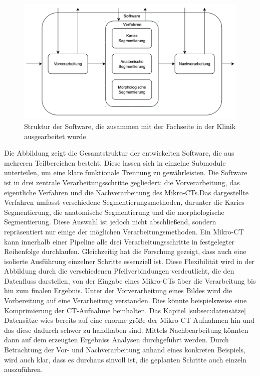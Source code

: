 \begin{figure}[h]
	\centering
	\includegraphics[width=1\textwidth]{img/struktur_der_software.png}
	\caption{Struktur der Software, die zusammen mit der Fachseite in der Klinik ausgearbeitet
	wurde}
	\label{fig:struktur_der_software}
\end{figure}

Die Abbildung zeigt die Gesamtstruktur der entwickelten Software, die aus mehreren
Teilbereichen besteht. Diese lassen sich in einzelne Submodule unterteilen, um eine
klare funktionale Trennung zu gewährleisten. Die Software ist in drei zentrale
Verarbeitungsschritte gegliedert: die Vorverarbeitung, das eigentliche Verfahren
und die Nachverarbeitung des Mikro-CTs.Das dargestellte Verfahren umfasst
verschiedene Segmentierungsmethoden, darunter die Karies-Segmentierung, die
anatomische Segmentierung und die morphologische Segmentierung. Diese Auswahl ist
jedoch nicht abschließend, sondern repräsentiert nur einige der möglichen
Verarbeitungsmethoden. Ein Mikro-CT kann innerhalb einer Pipeline alle drei Verarbeitungsschritte
in festgelegter Reihenfolge durchlaufen. Gleichzeitig hat die Forschung gezeigt,
dass auch eine isolierte Ausführung einzelner Schritte essenziell ist. Diese
Flexibilität wird in der Abbildung durch die verschiedenen Pfeilverbindungen
verdeutlicht, die den Datenfluss darstellen, von der Eingabe eines Mikro-CTs
über die Verarbeitung bis hin zum finalen Ergebnis. Unter der Vorverarbeitung eines
Bildes wird die Vorbereitung auf eine Verarbeitung verstanden. Dies könnte
beispielsweise eine Komprimierung der CT-Aufnahme beinhalten. Das Kapitel \ref{subsec:datensätze}
Datensätze wies bereits auf eine enorme größe der Mikro-CT-Aufnahmen hin und das
diese dadurch schwer zu handhaben sind. Mittels Nachbearbeitung könnten dann auf
dem erzeugten Ergebniss Analysen durchgeführt werden. Durch Betrachtung der Vor-
und Nachverarbeitung anhand eines konkreten Beispiels, wird auch klar, dass es
durchaus sinvoll ist, die geplanten Schritte auch einzeln auszuführen.

